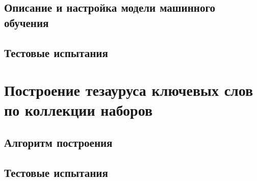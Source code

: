 \subsection{Описание и настройка модели машинного обучения}
\subsection{Тестовые испытания}
\section{Построение тезауруса ключевых слов по коллекции наборов}
\subsection{Алгоритм построения}
\subsection{Тестовые испытания}


